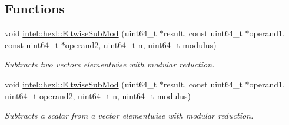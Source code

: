 \subsection*{Functions}
\begin{DoxyCompactItemize}
\item 
void \hyperlink{namespaceintel_1_1hexl_a6a45c30bc21b9b1e1410b23fce5424c8}{intel\+::hexl\+::\+Eltwise\+Sub\+Mod} (uint64\+\_\+t $\ast$result, const uint64\+\_\+t $\ast$operand1, const uint64\+\_\+t $\ast$operand2, uint64\+\_\+t n, uint64\+\_\+t modulus)
\begin{DoxyCompactList}\small\item\em Subtracts two vectors elementwise with modular reduction. \end{DoxyCompactList}\item 
void \hyperlink{namespaceintel_1_1hexl_abc13b8f383d3af6471a5261ee2213b40}{intel\+::hexl\+::\+Eltwise\+Sub\+Mod} (uint64\+\_\+t $\ast$result, const uint64\+\_\+t $\ast$operand1, uint64\+\_\+t operand2, uint64\+\_\+t n, uint64\+\_\+t modulus)
\begin{DoxyCompactList}\small\item\em Subtracts a scalar from a vector elementwise with modular reduction. \end{DoxyCompactList}\end{DoxyCompactItemize}

